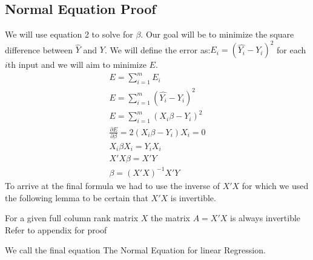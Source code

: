 \subsection{Normal Equation Proof}
We will use equation 2 to solve for $\beta$. Our goal will be to minimize the square difference between $\hat{Y}$ and $Y$. We will define the error as:$E_i=(\hat{Y_i}-Y_i)^2$ for each $i$th input and we will aim to minimize $E$.
\begin{eqnarray}
    E=\sum_{i=1}^{m} E_i \nonumber \\
    E=\sum_{i=1}^{m} (\hat{Y_i}-Y_i)^2 \nonumber \\
    E=\sum_{i=1}^{m} (X_i\beta-Y_i)^2 \nonumber \\
    \frac{\partial{E}}{\partial{\beta}}=2(X_i\beta-Y_i)X_i=0 \nonumber \\
    X_i\beta X_i=Y_iX_i \nonumber \\
    X'X\beta=X'Y \nonumber \\
    \beta={(X'X)}^{-1}X'Y
\end{eqnarray}
To arrive at the final formula we had to use the inverse of $X'X$ for which we used the following lemma to be certain that $X'X$ is invertible.
\begin{lemma}
    For a given full column rank matrix $X$ the matrix $A=X'X$ is always invertible\\
    Refer to appendix for proof
\end{lemma}
We call the final equation The Normal Equation for linear Regression. \\